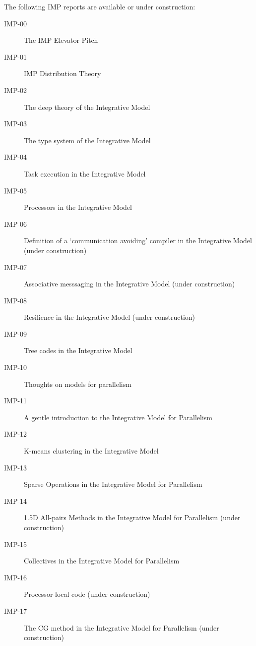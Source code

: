 
\begingroup \small
The following IMP reports are available or under construction:
\begin{description}
  \item[IMP-00] The IMP Elevator Pitch
  \item[IMP-01] IMP Distribution Theory
  \item[IMP-02] The deep theory of the Integrative Model
  \item[IMP-03] The type system of the Integrative Model
  \item[IMP-04] Task execution in the Integrative Model
  \item[IMP-05] Processors in the Integrative Model
  \item[IMP-06] Definition of a `communication avoiding' compiler in
    the Integrative Model (under construction)
  \item[IMP-07] Associative messsaging in the Integrative Model (under construction)
  \item[IMP-08] Resilience in the Integrative Model (under construction)
  \item[IMP-09] Tree codes in the Integrative Model
  \item[IMP-10] Thoughts on models for parallelism
  \item[IMP-11] A gentle introduction to the Integrative Model for Parallelism
  \item[IMP-12] K-means clustering in the Integrative Model
  \item[IMP-13] Sparse Operations in the Integrative Model for Parallelism
  \item[IMP-14] 1.5D All-pairs Methods in the Integrative Model for Parallelism (under construction)
  \item[IMP-15] Collectives in the Integrative Model for Parallelism
  \item[IMP-16] Processor-local code (under construction)
  \item[IMP-17] The CG method in the Integrative Model for Parallelism (under construction)

\end{description}
